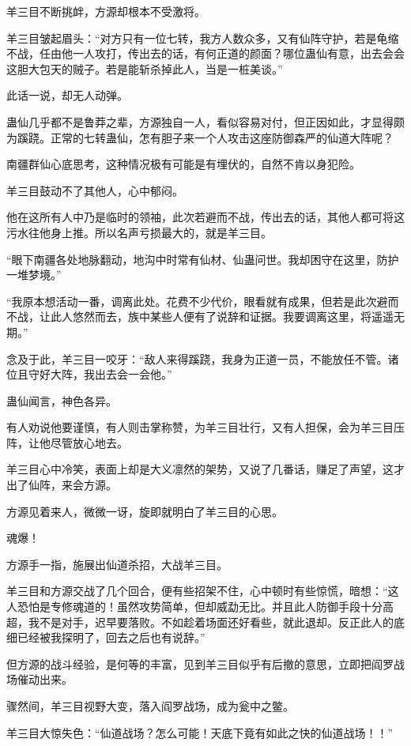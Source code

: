 \begin{this_body}
羊三目不断挑衅，方源却根本不受激将。

羊三目皱起眉头：“对方只有一位七转，我方人数众多，又有仙阵守护，若是龟缩不战，任由他一人攻打，传出去的话，有何正道的颜面？哪位蛊仙有意，出去会会这胆大包天的贼子。若是能斩杀掉此人，当是一桩美谈。”

此话一说，却无人动弹。

蛊仙几乎都不是鲁莽之辈，方源独自一人，看似容易对付，但正因如此，才显得颇为蹊跷。正常的七转蛊仙，怎有胆子来一个人攻击这座防御森严的仙道大阵呢？

南疆群仙心底思考，这种情况极有可能是有埋伏的，自然不肯以身犯险。

羊三目鼓动不了其他人，心中郁闷。

他在这所有人中乃是临时的领袖，此次若避而不战，传出去的话，其他人都可将这污水往他身上推。所以名声亏损最大的，就是羊三目。

“眼下南疆各处地脉翻动，地沟中时常有仙材、仙蛊问世。我却困守在这里，防护一堆梦境。”

“我原本想活动一番，调离此处。花费不少代价，眼看就有成果，但若是此次避而不战，让此人悠然而去，族中某些人便有了说辞和证据。我要调离这里，将遥遥无期。”

念及于此，羊三目一咬牙：“敌人来得蹊跷，我身为正道一员，不能放任不管。诸位且守好大阵，我出去会一会他。”

蛊仙闻言，神色各异。

有人劝说他要谨慎，有人则击掌称赞，为羊三目壮行，又有人担保，会为羊三目压阵，让他尽管放心地去。

羊三目心中冷笑，表面上却是大义凛然的架势，又说了几番话，赚足了声望，这才出了仙阵，来会方源。

方源见着来人，微微一讶，旋即就明白了羊三目的心思。

魂爆！

方源手一指，施展出仙道杀招，大战羊三目。

羊三目和方源交战了几个回合，便有些招架不住，心中顿时有些惊慌，暗想：“这人恐怕是专修魂道的！虽然攻势简单，但却威勐无比。并且此人防御手段十分高超，我不是对手，迟早要落败。不如趁着场面还好看些，就此退却。反正此人的底细已经被我探明了，回去之后也有说辞。”

但方源的战斗经验，是何等的丰富，见到羊三目似乎有后撤的意思，立即把阎罗战场催动出来。

骤然间，羊三目视野大变，落入阎罗战场，成为瓮中之鳖。

羊三目大惊失色：“仙道战场？怎么可能！天底下竟有如此之快的仙道战场！！”


\end{this_body}
